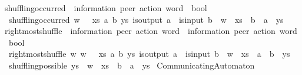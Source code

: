 \begin{isabellebody}
\isanewline
{}\isamarkupfalse%
\ shuffling{\isacharunderscore}{\kern0pt}occurred\ {\isacharcolon}{\kern0pt}{\isacharcolon}{\kern0pt}\ {\isachardoublequoteopen}{\isacharparenleft}{\kern0pt}{\isacharprime}{\kern0pt}information{\isacharcomma}{\kern0pt}\ {\isacharprime}{\kern0pt}peer{\isacharparenright}{\kern0pt}\ action\ word\ {\isasymRightarrow}\ bool{\isachardoublequoteclose}\ \isanewline
\ \ {\isachardoublequoteopen}shuffling{\isacharunderscore}{\kern0pt}occurred\ w\ {\isasymequiv}\ {\isacharparenleft}{\kern0pt}{\isasymexists}\ xs\ a\ b\ ys{\isachardot}{\kern0pt}\ is{\isacharunderscore}{\kern0pt}output\ a\ {\isasymand}\ is{\isacharunderscore}{\kern0pt}input\ b\ {\isasymand}\ w\ {\isacharequal}{\kern0pt}\ {\isacharparenleft}{\kern0pt}xs\ {\isacharat}{\kern0pt}\ b\ {\isacharhash}{\kern0pt}\ a\ {\isacharhash}{\kern0pt}\ ys{\isacharparenright}{\kern0pt}{\isacharparenright}{\kern0pt}{\isachardoublequoteclose}\isanewline
\isanewline
\ \isanewline
{}\isamarkupfalse%
\ rightmost{\isacharunderscore}{\kern0pt}shuffle\ {\isacharcolon}{\kern0pt}{\isacharcolon}{\kern0pt}\ {\isachardoublequoteopen}{\isacharparenleft}{\kern0pt}{\isacharprime}{\kern0pt}information{\isacharcomma}{\kern0pt}\ {\isacharprime}{\kern0pt}peer{\isacharparenright}{\kern0pt}\ action\ word\ {\isasymRightarrow}\ {\isacharparenleft}{\kern0pt}{\isacharprime}{\kern0pt}information{\isacharcomma}{\kern0pt}\ {\isacharprime}{\kern0pt}peer{\isacharparenright}{\kern0pt}\ action\ word\ {\isasymRightarrow}\ bool{\isachardoublequoteclose}\ \isanewline
\ \ {\isachardoublequoteopen}rightmost{\isacharunderscore}{\kern0pt}shuffle\ w\ w{\isacharprime}{\kern0pt}\ {\isasymequiv}\ {\isacharparenleft}{\kern0pt}{\isasymexists}\ xs\ a\ b\ ys{\isachardot}{\kern0pt}\ is{\isacharunderscore}{\kern0pt}output\ a\ {\isasymand}\ is{\isacharunderscore}{\kern0pt}input\ b\ {\isasymand}\ w\ {\isacharequal}{\kern0pt}\ {\isacharparenleft}{\kern0pt}xs\ {\isacharat}{\kern0pt}\ a\ {\isacharhash}{\kern0pt}\ b\ {\isacharhash}{\kern0pt}\ ys{\isacharparenright}{\kern0pt}\ {\isasymand}\ {\isacharparenleft}{\kern0pt}{\isasymnot}\ shuffling{\isacharunderscore}{\kern0pt}possible\ ys{\isacharparenright}{\kern0pt}\ {\isasymand}\ w{\isacharprime}{\kern0pt}\ {\isacharequal}{\kern0pt}\ {\isacharparenleft}{\kern0pt}xs\ {\isacharat}{\kern0pt}\ b\ {\isacharhash}{\kern0pt}\ a\ {\isacharhash}{\kern0pt}\ ys{\isacharparenright}{\kern0pt}{\isacharparenright}{\kern0pt}{\isachardoublequoteclose}\isanewline
\isanewline
{}\isamarkupfalse%
\ CommunicatingAutomaton\ {\isacharequal}{\kern0pt}\isanewline

\end{isabellebody}
